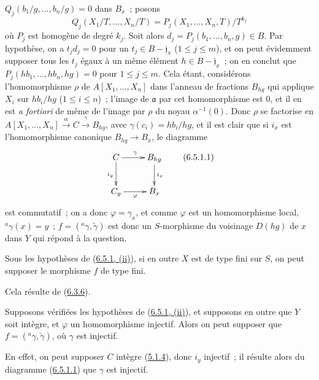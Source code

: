 \begin{enumerate}
    $Q_j(b_1/g,\ldots,b_n/g)=0$ dans $B_x$~; posons
    \[
      Q_j(X_1/T,\ldots,X_n/T)
      =P_j(X_1,\ldots,X_n,T)/T^{k_j}
    \]
    où $P_j$ est homogène de degré $k_j$. Soit alors
    $d_j=P_j(b_1,\ldots,b_n,g)\in B$. Par hypothèse, on a $t_jd_j=0$ pour un
    $t_j\in B-\mathfrak{j}_x$ ($1\leq j\leq m$), et on peut évidemment
    supposer tous les $t_j$
    égaux à un même élément $h\in B-\mathfrak{j}_x$~; on en conclut que
    $P_j(hb_1,\ldots,hb_n,hg)=0$ pour $1\leq j\leq m$. Cela étant, considérons
    l'homomorphisme $\rho$ de $A[X_1,\ldots,X_n]$ dans l'anneau de fractions
    $B_{hg}$ qui applique $X_i$ sur $hb_i/hg$ ($1\leq i\leq n$)~; l'image de
    $\mathfrak{a}$ par cet homomorphisme est 0, et il en est \emph{a fortiori}
    de même de l'image par $\rho$ du noyau $\alpha^{-1}(0)$. Donc $\rho$ se
    factorise en
    $A[X_1,\ldots,X_n]\xrightarrow{\alpha}C\xrightarrow{\gamma}B_{hg}$, avec
    $\gamma(c_i)=hb_i/hg$, et il est clair que si $i_x$ est l'homomorphisme
    canonique $B_{hg}\to B_x$, le diagramme
    \[
      \xymatrix{
        C\ar[r]^\gamma\ar[d]_{i_y} & B_{hg}\ar[d]^{i_x}\\
        C_y\ar[r]_\varphi & B_x
      }
      \tag{6.5.1.1}\label{I.6.5.1.1-fr}
    \]
    est commutatif~; on a donc $\varphi=\gamma_x$, et comme $\varphi$ est un
    homomorphisme local, ${}^a\gamma(x)=y$~; $f=({}^a\gamma,\widetilde{\gamma})$
    est donc un $S$-morphisme du voisinage $D(hg)$ de $x$ dans $Y$ qui répond à
    la question.
\end{enumerate}

\begin{corollary}[6.5.2]
\label{I.6.5.2-fr}
Sous les hypothèses de (\hyperref[I.6.5.1-fr]{6.5.1, (ii)}), si en outre $X$
est de type fini sur $S$, on peut supposer le morphisme $f$ de type fini.
\end{corollary}

Cela résulte de (\hyperref[I.6.3.6-fr]{6.3.6}).

\begin{corollary}[6.5.3]
\label{I.6.5.3-fr}
Supposons vérifiées les hypothèses de
(\hyperref[I.6.5.1-fr]{6.5.1, (ii)}), et supposons en outre que $Y$ soit
intègre, et $\varphi$ un homomorphisme injectif. Alors on peut supposer que
$f=({}^a\gamma,\widetilde{\gamma})$, où $\gamma$ est injectif.
\end{corollary}

En effet, on peut supposer $C$ intègre
(\hyperref[I.5.1.4-fr]{5.1.4}), donc $i_y$ injectif~; il résulte alors du
diagramme (\hyperref[I.6.5.1.1-fr]{6.5.1.1}) que $\gamma$ est injectif.


